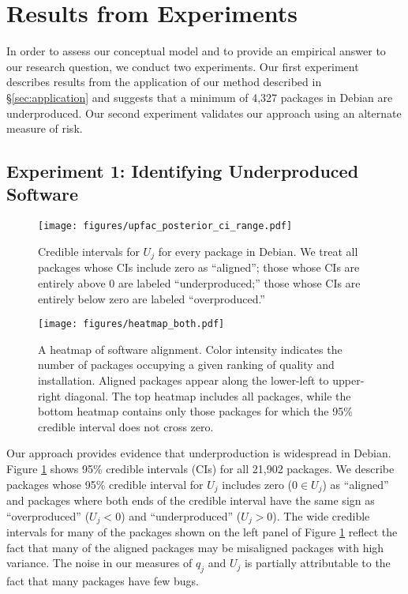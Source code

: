 \documentclass[10pt,conference]{IEEEtran}\usepackage[]{graphicx}\usepackage[usenames,dvipsnames]{color}
\begin{document}
\section{Results from Experiments}
\label{sec:experiments}


In order to assess our conceptual model and to provide an empirical answer to our research question,
we conduct two experiments. 
Our first experiment describes results from the application of our method described in §\ref{sec:application} and suggests that a minimum of 4,327
packages in Debian are underproduced. Our second experiment validates our approach using an alternate measure of risk.

\subsection{Experiment 1: Identifying Underproduced Software}%
\label{sec:debian_experiment}

\begin{figure}
\centering
\texttt{[image: figures/upfac\_posterior\_ci\_range.pdf]}
\caption{Credible intervals  for $U_j$ for every package in Debian. We treat all packages whose CIs include zero as ``aligned''; those whose CIs are entirely above 0 are labeled ``underproduced;'' those whose CIs are entirely below zero are labeled ``overproduced.'' \label{fig:caterpillar}}
\end{figure} 

\begin{figure}
\texttt{[image: figures/heatmap\_both.pdf]}
\caption{A heatmap of software alignment. Color intensity indicates the number of packages occupying a given ranking of quality and installation. Aligned packages appear along the lower-left to upper-right diagonal. The top heatmap includes all packages, while the bottom heatmap contains only those packages for which the 95\% credible interval does not cross zero.\label{fig:heatmap_both}}
\end{figure} 

Our approach provides evidence that underproduction is widespread in Debian. Figure \ref{fig:caterpillar} shows 95\% credible intervals (CIs) for all 21,902 packages. We describe packages whose 95\% credible interval for $U_j$ includes zero ($0 \in U_j$) as ``aligned'' and packages where both ends of the credible interval have the same sign as ``overproduced'' ($U_j<0$) and ``underproduced'' ($U_j>0$). The wide credible intervals for many of the packages shown on the left panel of Figure \ref{fig:caterpillar} reflect the fact that many of the aligned packages may be misaligned packages with high variance. The noise in our measures of $q_j$ and $U_j$ is partially attributable to the fact that many packages have few bugs.
\end{document}
